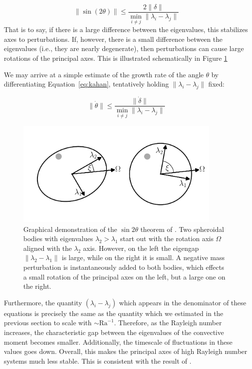 \documentclass[extra,mreferee]{gji}
\begin{document}
\begin{equation}
\lVert \sin(2 \theta) \rVert \le \frac{ 2 \lVert \delta \rVert}{ \displaystyle \min_{i \neq j} \lVert \lambda_i - \lambda_j \rVert }
\label{eq:kahan}
\end{equation} 
That is to say, if there is a large difference between the eigenvalues, this stabilizes axes to perturbations.  
If, however, there is a small difference between the eigenvalues (i.e., they are nearly degenerate), then perturbations can cause large rotations of the principal axes.
This is illustrated schematically in Figure \ref{fig:perturb}

We may arrive at a simple estimate of the growth rate of the angle $\theta$ by differentiating Equation~\eqref{eq:kahan}, tentatively holding $\lVert \lambda_i - \lambda_j \rVert$ fixed:

\begin{equation}
\lVert \dot{\theta} \rVert \le \frac{ \lVert \dot{\delta} \rVert}{ \displaystyle \min_{i \neq j} \lVert \lambda_i - \lambda_j \rVert }
\label{eq:grow_perturbation}
\end{equation} 

\begin{figure}
\centering
\includegraphics[width=0.9\textwidth]{figures/perturb.pdf}
\caption{Graphical demonstration of the $\sin{2 \theta}$ theorem of \citet{davis1970rotation}.  Two spheroidal bodies with eigenvalues $\lambda_2 > \lambda_1$ start out with the rotation axis $\Omega$ aligned with the $\lambda_2$ axis. However, on the left the eigengap $\lVert \lambda_2 - \lambda_1 \rVert$ is large, while on the right it is small.  A negative mass perturbation is instantaneously added to both bodies, which effects a small rotation of the principal axes on the left, but a large one on the right.}
\label{fig:perturb}
\end{figure}

Furthermore, the quantity $(\lambda_i-\lambda_j)$ which appears in the denominator of these equations is precisely the same as the quantity which we estimated in the previous section to scale with $\sim \mathrm{Ra}^{-1}$.
Therefore, as the Rayleigh number increases, the characteristic gap between the eigenvalues of the convective moment becomes smaller.  
Additionally, the timescale of fluctuations in these values goes down. 
Overall, this makes the principal axes of high Rayleigh number systems much less stable.
This is consistent with the result of \citet{richards1999polar}.
\end{document}
